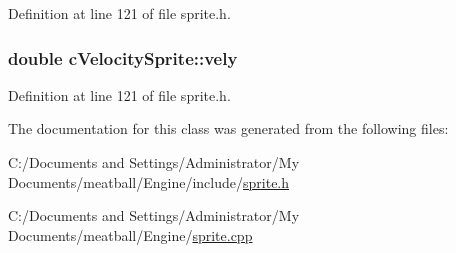 Definition at line 121 of file sprite.\-h.

\hypertarget{classc_velocity_sprite_a38b6e47912f9b5a385e90e5192850936}{
\subsubsection[{vely}]{\setlength{\rightskip}{0pt plus 5cm}double c\-Velocity\-Sprite\-::vely}}\label{classc_velocity_sprite_a38b6e47912f9b5a385e90e5192850936}


Definition at line 121 of file sprite.\-h.



The documentation for this class was generated from the following files\-:\begin{DoxyCompactItemize}
\item 
C\-:/\-Documents and Settings/\-Administrator/\-My Documents/meatball/\-Engine/include/\hyperlink{sprite_8h}{sprite.\-h}\item 
C\-:/\-Documents and Settings/\-Administrator/\-My Documents/meatball/\-Engine/\hyperlink{sprite_8cpp}{sprite.\-cpp}\end{DoxyCompactItemize}
